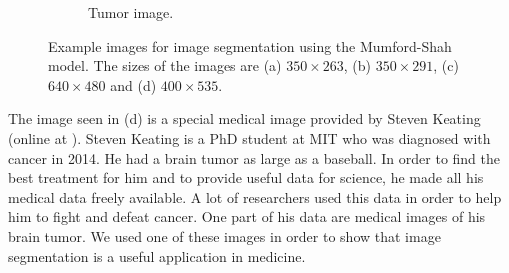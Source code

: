 \documentclass[abstracton]{scrreprt}
\begin{document}
\begin{figure}[!ht]
\begin{subfigure}[b]{0.25\textwidth}
                    \caption{Tumor image.}
                \end{subfigure}
                \caption[Example images for segmentation.]{Example images for image segmentation using the Mumford-Shah model. The sizes of the images are (a) $350 \times 263$, (b) $350 \times 291$, (c) $640 \times 480$ and (d) $400 \times 535$.}
            \label{fig:example_images_segmentation}
            \end{figure}

            The image seen in (d) is a special medical image provided by Steven Keating (online at \cite{Keating}). Steven Keating is a PhD student at MIT who was diagnosed with cancer in 2014. He had a brain tumor as large as a baseball. In order to find the best treatment for him and to provide useful data for science, he made all his medical data freely available. A lot of researchers used this data in order to help him to fight and defeat cancer. One part of his data are medical images of his brain tumor. We used one of these images in order to show that image segmentation is a useful application in medicine.\\
\end{document}
